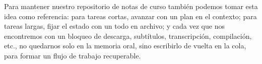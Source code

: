 \documentclass[a4paper]{article}
\begin{document}
Para mantener nuestro repositorio de notas de curso también podemos tomar esta idea como referencia: para tareas cortas, avanzar con un plan en el contexto; para tareas largas, fijar el estado con un todo en archivo; y cada vez que nos encontremos con un bloqueo de descarga, subtítulos, transcripción, compilación, etc., no quedarnos solo en la memoria oral, sino escribirlo de vuelta en la cola, para formar un flujo de trabajo recuperable.
\end{document}

